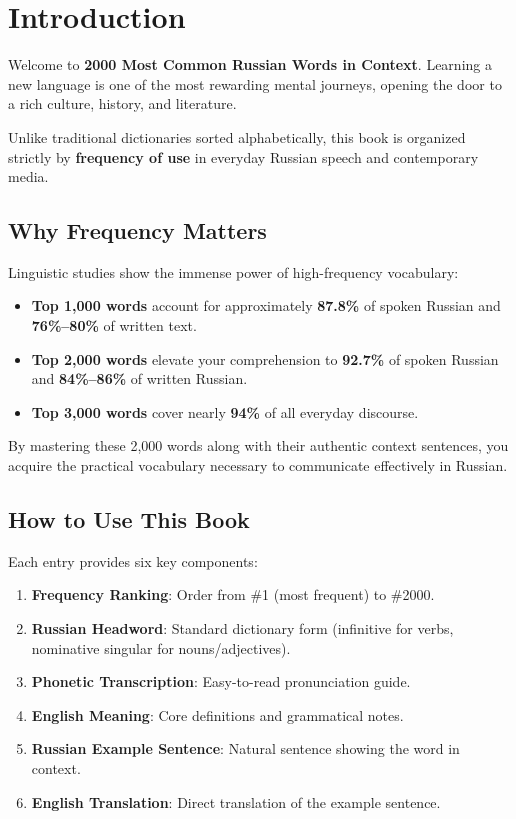 \chapter*{Introduction}

Welcome to \textbf{2000 Most Common Russian Words in Context}. Learning a new language is one of the most rewarding mental journeys, opening the door to a rich culture, history, and literature.

Unlike traditional dictionaries sorted alphabetically, this book is organized strictly by \textbf{frequency of use} in everyday Russian speech and contemporary media.

\section*{Why Frequency Matters}

Linguistic studies show the immense power of high-frequency vocabulary:
\begin{itemize}[leftmargin=1.5em, itemsep=0.4em]
  \item \textbf{Top 1,000 words} account for approximately \textbf{87.8\%} of spoken Russian and \textbf{76\%--80\%} of written text.
  \item \textbf{Top 2,000 words} elevate your comprehension to \textbf{92.7\%} of spoken Russian and \textbf{84\%--86\%} of written Russian.
  \item \textbf{Top 3,000 words} cover nearly \textbf{94\%} of all everyday discourse.
\end{itemize}

By mastering these 2,000 words along with their authentic context sentences, you acquire the practical vocabulary necessary to communicate effectively in Russian.

\section*{How to Use This Book}

Each entry provides six key components:
\begin{enumerate}[leftmargin=1.5em, itemsep=0.3em]
  \item \textbf{Frequency Ranking}: Order from \#1 (most frequent) to \#2000.
  \item \textbf{Russian Headword}: Standard dictionary form (infinitive for verbs, nominative singular for nouns/adjectives).
  \item \textbf{Phonetic Transcription}: Easy-to-read pronunciation guide.
  \item \textbf{English Meaning}: Core definitions and grammatical notes.
  \item \textbf{Russian Example Sentence}: Natural sentence showing the word in context.
  \item \textbf{English Translation}: Direct translation of the example sentence.
\end{enumerate}
